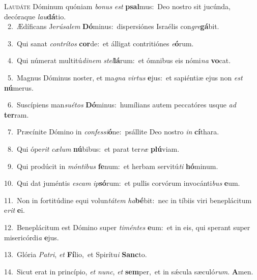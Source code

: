 \lettrine{\initial\textcolor{\initialcolor}{L}}{audáte} Dóminum quóniam \textit{bo}\-\textit{nus} \textit{est} \textbf{psal}\-mus:~\star Deo nostro sit jucúnda, decóraque \textit{lau}\-\textbf{dá}tio.\\
{\numbfont\textcolor{\numbcolor}{~2.}}~Ædíficans Je\-\textit{rú}\-\textit{sa}\textit{lem} \textbf{Dó}\-minus:~\star dispersiónes Israélis con\-\textit{gre}\-\textbf{gá}bit.\par
{\numbfont\textcolor{\numbcolor}{~3.}}~Qui sanat \textit{con}\-\textit{trí}\textit{tos} \textbf{cor}\-de:~\star et álligat contritiónes \textit{e}\-\textbf{ó}rum.\par
{\numbfont\textcolor{\numbcolor}{~4.}}~Qui númerat multitú\-\textit{di}\-\textit{nem} \textit{stel}\-\textbf{lá}rum:~\star et ómnibus eis nómi\textit{na} \textbf{vo}\-cat.\par
{\numbfont\textcolor{\numbcolor}{~5.}}~Magnus Dóminus noster, et ma\textit{gna} \textit{vir}\-\textit{tus} \textbf{e}\-jus:~\star et sapiéntiæ ejus non \textit{est} \textbf{nú}\-merus.\par
{\numbfont\textcolor{\numbcolor}{~6.}}~Suscípiens man\-\textit{su}\-\textit{é}\textit{tos} \textbf{Dó}\-minus:~\star humílians autem peccatóres usque \textit{ad} \textbf{ter}\-ram.\par
{\numbfont\textcolor{\numbcolor}{~7.}}~Præcínite Dómino in \textit{con}\-\textit{fes}\textit{si}\textbf{ó}ne:~\star psállite Deo nostro \textit{in} \textbf{cí}\-thara.\par
{\numbfont\textcolor{\numbcolor}{~8.}}~Qui ópe\textit{rit} \textit{cæ}\-\textit{lum} \textbf{nú}\-bibus:~\star et parat ter\textit{ræ} \textbf{plú}\-viam.\par
{\numbfont\textcolor{\numbcolor}{~9.}}~Qui prodúcit in \textit{món}\-\textit{ti}\textit{bus} \textbf{fe}\-num:~\star et herbam servitú\textit{ti} \textbf{hó}\-minum.\par
{\numbfont\textcolor{\numbcolor}{10.}}~Qui dat juméntis \textit{es}\-\textit{cam} \textit{ip}\-\textbf{só}rum:~\star et pullis corvórum invocánti\textit{bus} \textbf{e}\-um.\par
{\numbfont\textcolor{\numbcolor}{11.}}~Non in fortitúdine equi volun\-\textit{tá}\-\textit{tem} \textit{ha}\-\textbf{bé}bit:~\star nec in tíbiis viri beneplácitum e\textit{rit} \textbf{e}\-i.\par
{\numbfont\textcolor{\numbcolor}{12.}}~Beneplácitum est Dómino super \textit{ti}\-\textit{mén}\textit{tes} \textbf{e}\-um:~\star et in eis, qui sperant super misericórdi\textit{a} \textbf{e}\-jus.\par
{\numbfont\textcolor{\numbcolor}{13.}}~Glória \textit{Pa}\-\textit{tri}, \textit{et} \textbf{Fí}\-lio,~\star et Spirítu\textit{i} \textbf{Sanc}\-to.\par
{\numbfont\textcolor{\numbcolor}{14.}}~Sicut erat in princípio, \textit{et} \textit{nunc}\-, \textit{et} \textbf{sem}\-per,~\star et in sǽcula sæculó\-\textit{rum}\-. \textbf{A}\-men.\par
